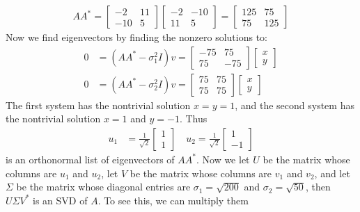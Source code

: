 \documentclass[12pt]{article}
\newenvironment{sol}[1][Solution]{\begin{trivlist}
		\item[\hskip \labelsep {\bfseries #1:}]}{\end{trivlist}}
\begin{document}
\begin{sol}
\begin{enumerate}[label=(\alph*)]
		\begin{align*}
			AA^*=
			\begin{bmatrix}
				-2 & 11\\
				-10 & 5
			\end{bmatrix}
			\begin{bmatrix}
				-2 & -10\\
				11 & 5
			\end{bmatrix}
			=
			\begin{bmatrix}
				125 & 75\\
				75 &  125
			\end{bmatrix}
		\end{align*}
		Now we find eigenvectors by finding the nonzero solutions to:
		\begin{align*}
			0&=(AA^*-\sigma_1^2 I)v=\begin{bmatrix}
				-75 & 75\\
				75 & -75
			\end{bmatrix}\begin{bmatrix}
			x\\
			y
		\end{bmatrix}\\
		0&=(AA^*-\sigma_2^2 I)v=\begin{bmatrix}
			75 & 75\\
			75 & 75
		\end{bmatrix}\begin{bmatrix}
			x\\
			y
		\end{bmatrix}
		\end{align*}
		The first system has the nontrivial solution $x=y=1$, and the second system has the nontrivial solution
		$x=1$ and $y=-1$. Thus
		\begin{align*}
			u_1 &=\frac{1}{\sqrt{2}} \begin{bmatrix}
				1\\
				1
			\end{bmatrix}
			\quad
			u_2 = \frac{1}{\sqrt{2}}\begin{bmatrix}
				1 \\
				-1
			\end{bmatrix}
		\end{align*}
		is an orthonormal list of eigenvectors of $AA^*$. Now we let $U$ be the matrix whose columns are $u_1$ and $u_2$,
		let $V$ be the matrix whose columns are $v_1$ and $v_2$, and let $\Sigma$ be the matrix whose diagonal
		entries are $\sigma_1=\sqrt{200}$ and $\sigma_2=\sqrt{50}$, then $U\Sigma V^*$ is an SVD of $A$. To see
		this, we can multiply them

\end{enumerate}
\end{sol}
\end{document}
